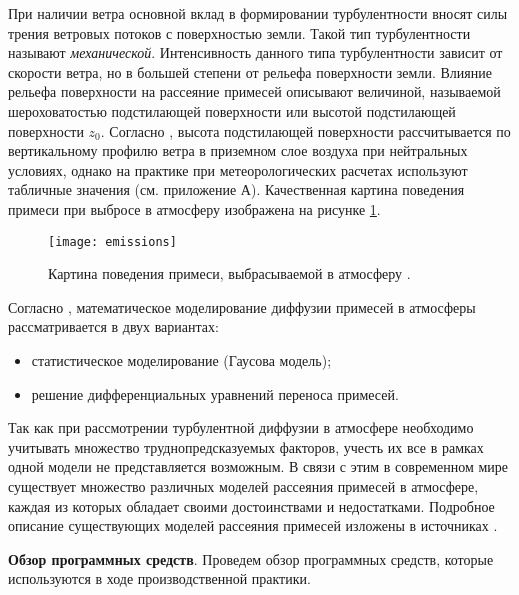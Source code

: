 При наличии ветра основной вклад в формировании турбулентности вносят силы трения ветровых потоков с поверхностью земли. 
Такой тип турбулентности называют \textit{механической}. Интенсивность данного типа турбулентности зависит от скорости 
ветра, но в большей степени от рельефа поверхности земли. Влияние рельефа поверхности на рассеяние примесей описывают 
величиной, называемой шероховатостью подстилающей поверхности или высотой подстилающей поверхности $z_0$. Согласно 
\cite{setton, bizova_meteor, berlyand}, высота подстилающей поверхности рассчитывается по вертикальному профилю ветра в 
приземном слое воздуха при нейтральных условиях, однако на практике при метеорологических расчетах используют табличные 
значения \cite{mlyavaya} (см. приложение А). Качественная картина поведения примеси при выбросе в атмосферу изображена 
на рисунке \ref{fig_emissions}.

\begin{figure}[ht]
\centering
	\texttt{[image: emissions]}
	\captionsetup{justification=centering}
    \caption{Картина поведения примеси, выбрасываемой в атмосферу \cite{gusev_bio}.}
    \label{fig_emissions}
\end{figure}

Согласно \cite{gusev_bio}, математическое моделирование диффузии примесей в атмосферы рассматривается в двух вариантах: 
\begin{itemize}
	\item статистическое моделирование (Гаусова модель);
	\item решение дифференциальных уравнений переноса примесей.
\end{itemize}

Так как при рассмотрении турбулентной диффузии в атмосфере необходимо учитывать множество труднопредсказуемых факторов, 
учесть их все в рамках одной модели не представляется возможным. В связи с этим в современном мире существует множество 
различных моделей рассеяния примесей в атмосфере, каждая из которых обладает своими достоинствами и недостатками. 
Подробное описание существующих моделей рассеяния примесей изложены в источниках \cite{setton, bizova_meteor, berlyand, 
radio_transfer, disper_atmos, met_radio, general_exposure, laihtman, bizova_scatter, disper_models}.

\textbf{Обзор программных средств}. Проведем обзор программных средств, которые используются в ходе производственной 
практики.

